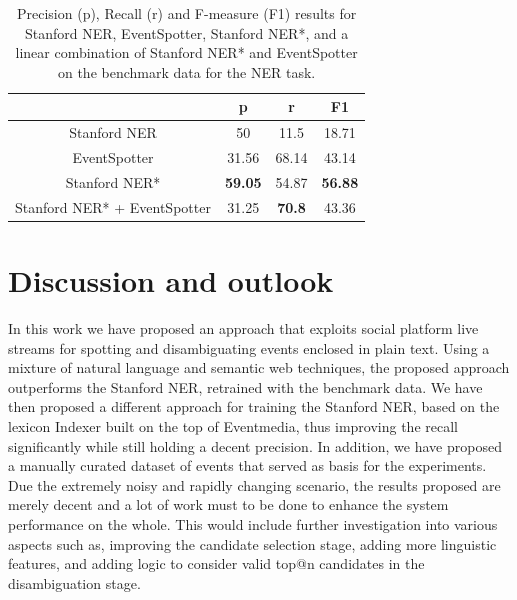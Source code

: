 \documentclass[10pt,a4paper]{article}
\begin{document}
\begin{table}[h]
\centering %
\begin{tabular}{c c c c} %
\hline %
& p & r & F1 \\ [0.5ex] %
\hline\hline %
Stanford NER & 50 & 11.5 & 18.71 \\
EventSpotter & 31.56 & 68.14 & 43.14 \\
\hline
Stanford NER* & \textbf{59.05} & 54.87 & \textbf{56.88} \\
Stanford NER* + EventSpotter & 31.25 & \textbf{70.8} & 43.36 \\
\hline %
\end{tabular}
\caption{Precision (p), Recall (r) and F-measure (F1) results for Stanford NER, EventSpotter, Stanford NER*, and a linear combination of Stanford NER* and EventSpotter on the benchmark data for the NER task.} %
\label{tab:manual} %
\end{table}

\section{Discussion and outlook}
In this work we have proposed an approach that exploits social platform live streams for spotting and disambiguating events enclosed in plain text. Using a mixture of natural language and semantic web techniques, the proposed approach outperforms the Stanford NER, retrained with the benchmark data. We have then proposed a different approach for training the Stanford NER, based on the lexicon Indexer built on the top of Eventmedia, thus improving the recall significantly while still holding a decent precision. In addition, we have proposed a manually curated dataset of events that served as basis for the experiments. Due the extremely noisy and rapidly changing scenario, the results proposed are merely decent and a lot of work must to be done to enhance the system performance on the whole. This would include further investigation into various aspects such as, improving the candidate selection stage, adding more linguistic features, and adding logic to consider valid top@n candidates in the disambiguation stage.
\end{document}
